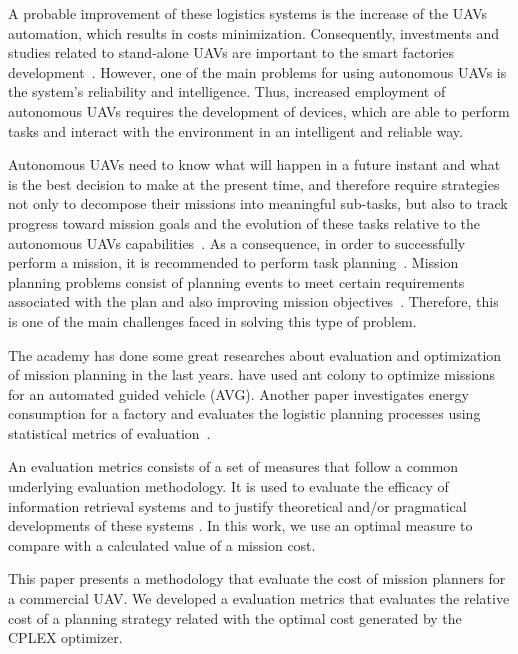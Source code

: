 \documentclass[conference,harvard,brazil,english]{sbatex}
\begin{document}
A probable improvement of these logistics systems is the increase of the UAVs automation, which results in costs minimization. Consequently, investments and studies related to stand-alone UAVs are important to the smart factories development~\cite{hern2014dhl}. However, one of the main problems for using autonomous UAVs is the system's reliability and intelligence. Thus, increased employment of autonomous UAVs requires the development of devices, which are able to perform tasks and interact with the environment in an intelligent and reliable way.

Autonomous UAVs need to know what will happen in a future instant and what is the best decision to make at the present time, and therefore require strategies not only to decompose their missions into meaningful sub-tasks, but also to track progress toward mission goals and the evolution of these tasks relative to the autonomous UAVs capabilities~\cite{finn2012developments}. As a consequence, in order to successfully perform a mission, it is recommended to perform task planning~\cite{successplan}. Mission planning problems consist of planning events to meet certain requirements associated with the plan and also improving mission objectives~\cite{krozel1988search}. Therefore, this is one of the main challenges faced in solving this type of problem.

The academy has done some great researches about evaluation and optimization of mission planning in the last years.  have used ant colony to optimize missions for an automated guided vehicle (AVG). Another paper investigates energy consumption for a factory and evaluates the logistic planning processes using statistical metrics of evaluation~\cite{muller2012analyzing}.

An evaluation metrics consists of a set of measures that follow a common underlying evaluation methodology. It is used to evaluate the efficacy of information retrieval systems and to justify theoretical and/or pragmatical developments of these systems \cite{pehcevski2009evaluation}. In this work, we use an optimal measure to compare with a calculated value of a mission cost.

This paper presents a methodology that evaluate the cost of mission planners for a commercial UAV. We developed a evaluation metrics that evaluates the relative cost of a planning strategy related with the optimal cost generated by the CPLEX optimizer. %
\end{document}
